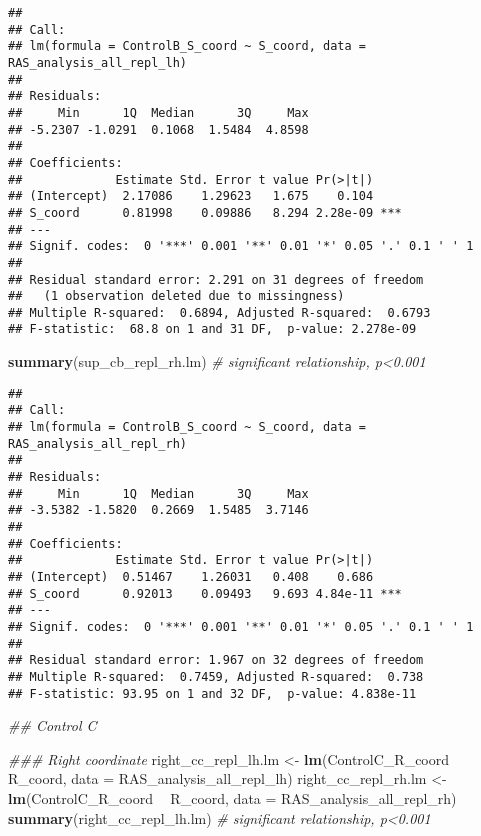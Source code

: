 \documentclass[
]{article}
\newenvironment{Shaded}{\begin{snugshade}}{\end{snugshade}}
\newcommand{\CommentTok}[1]{\textcolor[rgb]{0.56,0.35,0.01}{\textit{#1}}}
\newcommand{\DataTypeTok}[1]{\textcolor[rgb]{0.13,0.29,0.53}{#1}}
\newcommand{\KeywordTok}[1]{\textcolor[rgb]{0.13,0.29,0.53}{\textbf{#1}}}
\newcommand{\NormalTok}[1]{#1}
\newcommand{\OperatorTok}[1]{\textcolor[rgb]{0.81,0.36,0.00}{\textbf{#1}}}
\newcommand{\StringTok}[1]{\textcolor[rgb]{0.31,0.60,0.02}{#1}}
\begin{document}
\begin{verbatim}
## 
## Call:
## lm(formula = ControlB_S_coord ~ S_coord, data = RAS_analysis_all_repl_lh)
## 
## Residuals:
##     Min      1Q  Median      3Q     Max 
## -5.2307 -1.0291  0.1068  1.5484  4.8598 
## 
## Coefficients:
##             Estimate Std. Error t value Pr(>|t|)    
## (Intercept)  2.17086    1.29623   1.675    0.104    
## S_coord      0.81998    0.09886   8.294 2.28e-09 ***
## ---
## Signif. codes:  0 '***' 0.001 '**' 0.01 '*' 0.05 '.' 0.1 ' ' 1
## 
## Residual standard error: 2.291 on 31 degrees of freedom
##   (1 observation deleted due to missingness)
## Multiple R-squared:  0.6894, Adjusted R-squared:  0.6793 
## F-statistic:  68.8 on 1 and 31 DF,  p-value: 2.278e-09
\end{verbatim}

\begin{Shaded}
\begin{Highlighting}[]
\KeywordTok{summary}\NormalTok{(sup_cb_repl_rh.lm) }\CommentTok{# significant relationship, p<0.001}
\end{Highlighting}
\end{Shaded}

\begin{verbatim}
## 
## Call:
## lm(formula = ControlB_S_coord ~ S_coord, data = RAS_analysis_all_repl_rh)
## 
## Residuals:
##     Min      1Q  Median      3Q     Max 
## -3.5382 -1.5820  0.2669  1.5485  3.7146 
## 
## Coefficients:
##             Estimate Std. Error t value Pr(>|t|)    
## (Intercept)  0.51467    1.26031   0.408    0.686    
## S_coord      0.92013    0.09493   9.693 4.84e-11 ***
## ---
## Signif. codes:  0 '***' 0.001 '**' 0.01 '*' 0.05 '.' 0.1 ' ' 1
## 
## Residual standard error: 1.967 on 32 degrees of freedom
## Multiple R-squared:  0.7459, Adjusted R-squared:  0.738 
## F-statistic: 93.95 on 1 and 32 DF,  p-value: 4.838e-11
\end{verbatim}

\begin{Shaded}
\begin{Highlighting}[]
\CommentTok{## Control C}

\CommentTok{### Right coordinate }
\NormalTok{right_cc_repl_lh.lm <-}\StringTok{ }\KeywordTok{lm}\NormalTok{(ControlC_R_coord }\OperatorTok{~}\StringTok{ }\NormalTok{R_coord, }\DataTypeTok{data =}\NormalTok{ RAS_analysis_all_repl_lh)}
\NormalTok{right_cc_repl_rh.lm <-}\StringTok{ }\KeywordTok{lm}\NormalTok{(ControlC_R_coord }\OperatorTok{~}\StringTok{ }\NormalTok{R_coord, }\DataTypeTok{data =}\NormalTok{ RAS_analysis_all_repl_rh)}
\KeywordTok{summary}\NormalTok{(right_cc_repl_lh.lm) }\CommentTok{# significant relationship, p<0.001}
\end{Highlighting}
\end{Shaded}
\end{document}
